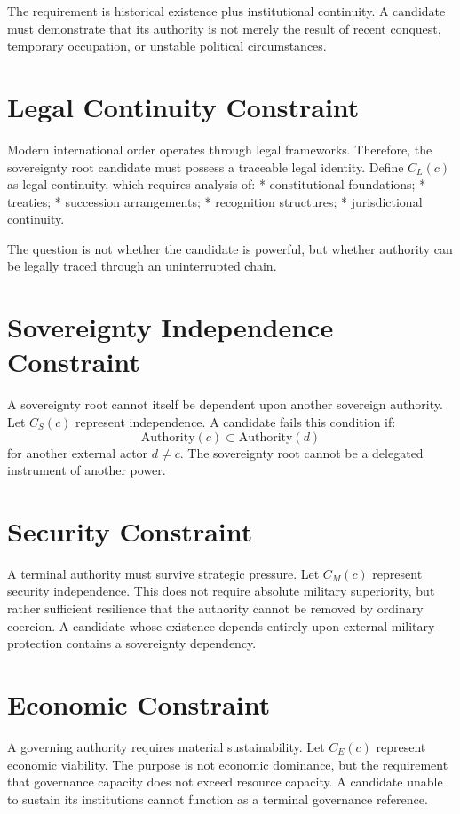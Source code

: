 \documentclass[11pt,openany]{book}
\theoremstyle{plain}
\theoremstyle{definition}
\begin{document}
The requirement is historical existence plus institutional continuity. A candidate must demonstrate that its authority is not merely the result of recent conquest, temporary occupation, or unstable political circumstances.

\section*{Legal Continuity Constraint}

Modern international order operates through legal frameworks. Therefore, the sovereignty root candidate must possess a traceable legal identity. Define \(C_L(c)\) as legal continuity, which requires analysis of:
* constitutional foundations;
* treaties;
* succession arrangements;
* recognition structures;
* jurisdictional continuity.

The question is not whether the candidate is powerful, but whether authority can be legally traced through an uninterrupted chain.

\section*{Sovereignty Independence Constraint}

A sovereignty root cannot itself be dependent upon another sovereign authority. Let \(C_S(c)\) represent independence. A candidate fails this condition if:
\[
\text{Authority}(c) \subset \text{Authority}(d)
\]
for another external actor \(d \neq c\). The sovereignty root cannot be a delegated instrument of another power.

\section*{Security Constraint}

A terminal authority must survive strategic pressure. Let \(C_M(c)\) represent security independence. This does not require absolute military superiority, but rather sufficient resilience that the authority cannot be removed by ordinary coercion. A candidate whose existence depends entirely upon external military protection contains a sovereignty dependency.

\section*{Economic Constraint}

A governing authority requires material sustainability. Let \(C_E(c)\) represent economic viability. The purpose is not economic dominance, but the requirement that governance capacity does not exceed resource capacity. A candidate unable to sustain its institutions cannot function as a terminal governance reference.
\end{document}
